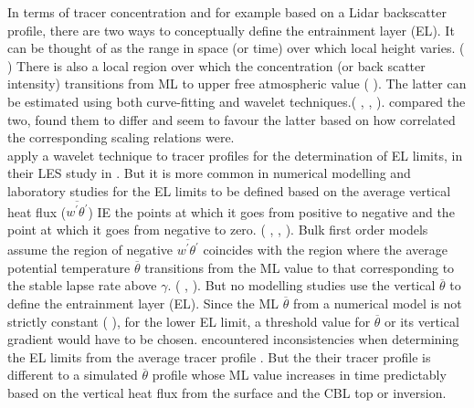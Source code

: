 In terms of tracer concentration and for example based on a Lidar backscatter profile, there are two ways to conceptually
define the entrainment layer (\acs{EL}).  It can be thought of as the range in space (or time) over which local height
varies. (\citeauthor{CrumStullEl} \cite{CrumStullEl}) There is also a local region over which the concentration (or back
scatter intensity) transitions from \acs{ML} to upper free atmospheric value (\citeauthor{Traum11} \cite{Traum11}).  The latter
can be estimated using both curve-fitting and wavelet techniques.(\citeauthor{Traum11} \cite{Traum11}, \citeauthor{SteynBaldHoff} 
\cite{SteynBaldHoff}, \citeauthor{BrooksFowler2} \cite{BrooksFowler2}). \citeauthor{Traum11} \cite{Traum11} compared the
two, found them to differ and seem to favour the latter based on how correlated the corresponding scaling relations were.\\

\citeauthor{BrooksFowler2} apply a wavelet technique to tracer profiles for the determination of 
\acs{EL} limits, in their \acs{LES} study in \cite{BrooksFowler2}.  But it is more common in numerical modelling and laboratory studies
for the \acs{EL} limits to be defined based on the average vertical heat flux ($\overline{w^{'}\theta^{'}}$) IE the points
at which it goes from positive to negative and the point at which it goes from negative to zero. (\citeauthor{DearWill80} \cite{DearWill80}
,\citeauthor{FedConzMir04} \cite{FedConzMir04}, \citeauthor{GarciaMellado} \cite{GarciaMellado}). Bulk first order models assume
the region of negative $\overline{w^{'}\theta^{'}}$ coincides with the region where the average potential temperature $\overline{\theta}$
transitions from the \acs{ML} value to that corresponding to the stable lapse rate above $\gamma$. (\citeauthor{Deardorff79} \cite{Deardorff79}, 
\cite{FedConzMir04} \cite{FedConzMir04}).  But no modelling studies use the vertical $\overline{\theta}$ to define the entrainment layer (\acs{EL}).  Since the \acs{ML} $\overline{\theta}$ from a numerical model is not strictly constant (\citeauthor{FedConzMir04} \cite{FedConzMir04}), 
for the lower \acs{EL} limit, a threshold value for $\overline{\theta}$ or its vertical gradient would have to be chosen.  \citeauthor{BrooksFowler2} encountered inconsistencies when determining the \acs{EL} limits from the average tracer profile \cite{BrooksFowler2}.  But the their tracer profile is different to a simulated $\overline{\theta}$ profile whose \acs{ML} value increases in time predictably based on the vertical heat flux from the surface and the \acs{CBL} top or inversion.             

